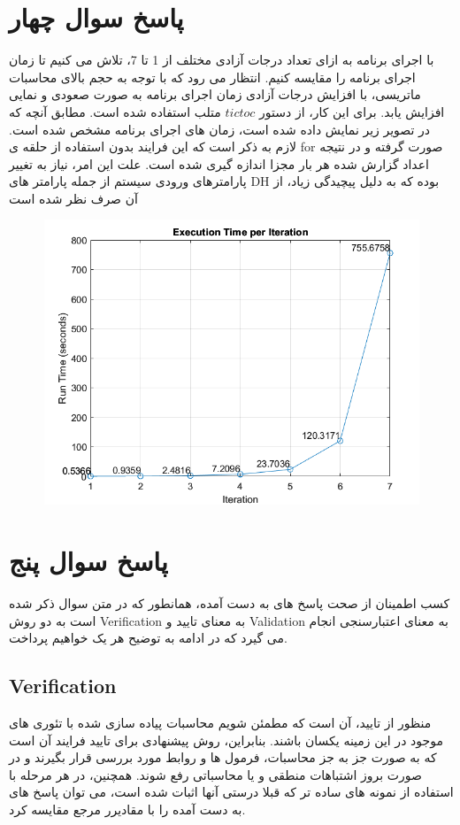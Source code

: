 \section*{پاسخ سوال چهار}
با اجرای برنامه به ازای تعداد درجات آزادی مختلف از 1 تا 7، تلاش می کنیم تا زمان اجرای برنامه را مقایسه کنیم. انتظار می رود که با توجه به حجم بالای محاسبات ماتریسی، با افزایش درجات آزادی زمان اجرای برنامه به صورت صعودی و نمایی افزایش یابد. برای این کار، از دستور $tic toc$ متلب استفاده شده است. مطابق آنچه که در تصویر زیر نمایش داده شده است، زمان های اجرای برنامه مشخص شده است. لازم به ذکر است که این فرایند بدون استفاده از حلقه ی for صورت گرفته و در نتیجه اعداد گزارش شده هر بار مجزا اندازه گیری شده است. علت این امر، نیاز به تغییر پارامترهای ورودی سیستم  از جمله پارامتر های DH بوده که به دلیل پیچیدگی زیاد، از آن صرف نظر شده است
\begin{figure}[!h]
	\centering
	\includegraphics[width=1\linewidth]{../img/screenshot004}
	\caption{}
	\label{fig:screenshot004}
\end{figure}
\section*{پاسخ سوال پنج}
کسب اطمینان از صحت پاسخ های به دست آمده، همانطور که در متن سوال ذکر شده است به دو روش Verification به معنای تایید و Validation به معنای اعتبارسنجی انجام می گیرد که در ادامه به توضیح هر یک خواهیم پرداخت.
\subsection*{Verification}
منظور از تایید، آن است که مطمئن شویم محاسبات پیاده سازی شده با تئوری های موجود در این زمینه یکسان باشند. بنابراین، روش پیشنهادی برای تایید فرایند آن است که به صورت جز به جز محاسبات، فرمول ها و روابط مورد بررسی قرار بگیرند و در صورت بروز اشتباهات منطقی و یا محاسباتی رفع شوند. همچنین، در هر مرحله با استفاده از نمونه های ساده تر که قبلا درستی آنها اثبات شده است، می توان پاسخ های به دست آمده را با مقادیرر مرجع مقایسه کرد.

